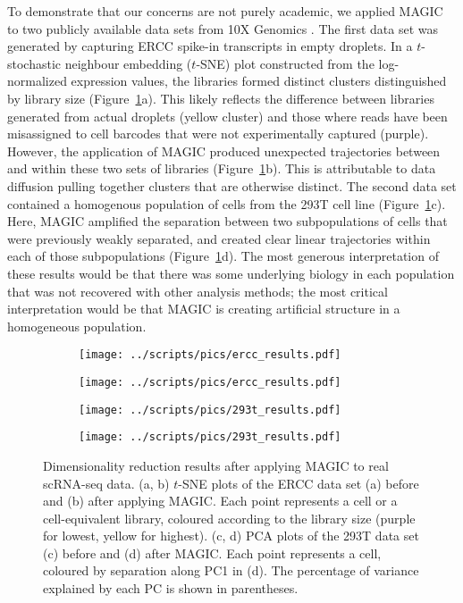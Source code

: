 \documentclass[10pt,letterpaper]{article}
\begin{document}
To demonstrate that our concerns are not purely academic, we applied MAGIC to two publicly available data sets from 10X Genomics \cite{zheng2017massively}.
The first data set was generated by capturing ERCC spike-in transcripts in empty droplets.
In a $t$-stochastic neighbour embedding ($t$-SNE) \cite{van2008visualizing} plot constructed from the log-normalized expression values, the libraries formed distinct clusters distinguished by library size (Figure~\ref{fig:realdata}a).
This likely reflects the difference between libraries generated from actual droplets (yellow cluster) and those where reads have been misassigned to cell barcodes that were not experimentally captured (purple).
However, the application of MAGIC produced unexpected trajectories between and within these two sets of libraries (Figure~\ref{fig:realdata}b).
This is attributable to data diffusion pulling together clusters that are otherwise distinct.
The second data set contained a homogenous population of cells from the 293T cell line (Figure~\ref{fig:realdata}c).
Here, MAGIC amplified the separation between two subpopulations of cells that were previously weakly separated,
and created clear linear trajectories within each of those subpopulations (Figure~\ref{fig:realdata}d).
The most generous interpretation of these results would be that there was some underlying biology in each population that was not recovered with other analysis methods;
the most critical interpretation would be that MAGIC is creating artificial structure in a homogeneous population.

\begin{figure}[btp]
\centering
\begin{subfigure}[b]{0.49\textwidth}
    \texttt{[image: ../scripts/pics/ercc\_results.pdf]}
    \caption{}
\end{subfigure}
\begin{subfigure}[b]{0.49\textwidth}
    \texttt{[image: ../scripts/pics/ercc\_results.pdf]}
    \caption{}
\end{subfigure}
\begin{subfigure}[b]{0.49\textwidth}
    \texttt{[image: ../scripts/pics/293t\_results.pdf]}
    \caption{}
\end{subfigure}
\begin{subfigure}[b]{0.49\textwidth}
    \texttt{[image: ../scripts/pics/293t\_results.pdf]}
    \caption{}
\end{subfigure}
\caption{Dimensionality reduction results after applying MAGIC to real scRNA-seq data.
(a, b) $t$-SNE plots of the ERCC data set (a) before and (b) after applying MAGIC.
Each point represents a cell or a cell-equivalent library, coloured according to the library size (purple for lowest, yellow for highest).
(c, d) PCA plots of the 293T data set (c) before and (d) after MAGIC.
Each point represents a cell, coloured by separation along PC1 in (d).
The percentage of variance explained by each PC is shown in parentheses.}
\label{fig:realdata}
\end{figure}
\end{document}
